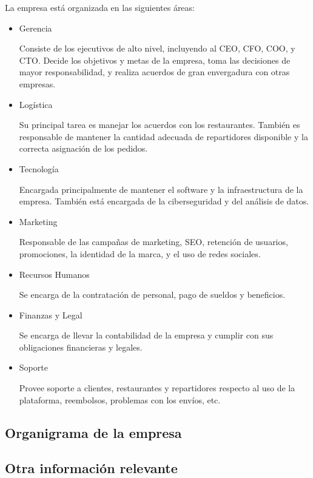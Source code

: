 \documentclass[11pt]{article}
\begin{document}
La empresa está organizada en las siguientes áreas:

\begin{itemize}
    \item Gerencia
    
    Consiste de los ejecutivos de alto nivel, incluyendo al CEO, CFO, COO, y CTO. Decide los objetivos y metas de la empresa, toma las decisiones de mayor responsabilidad, y realiza acuerdos de gran envergadura con otras empresas.

    \item Logística
    
    Su principal tarea es manejar los acuerdos con los restaurantes. También es responsable de mantener la cantidad adecuada de repartidores disponible y la correcta asignación de los pedidos.
    
    \item Tecnología
    
    Encargada principalmente de mantener el software y la infraestructura de la empresa. También está encargada de la ciberseguridad y del análisis de datos.

    \item Marketing
    
    Responsable de las campañas de marketing, SEO, retención de usuarios, promociones, la identidad de la marca, y el uso de redes sociales.

    \item Recursos Humanos
    
    Se encarga de la contratación de personal, pago de sueldos y beneficios.

    \item Finanzas y Legal
    
    Se encarga de llevar la contabilidad de la empresa y cumplir con sus obligaciones financieras y legales.

    \item Soporte
    
    Provee soporte a clientes, restaurantes y repartidores respecto al uso de la plataforma, reembolsos, problemas con los envíos, etc.    
    
    
\end{itemize}

\subsection{Organigrama de la empresa}

\subsection{Otra información relevante}
\end{document}

